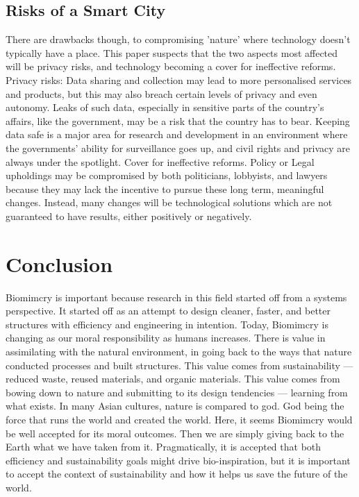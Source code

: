 \subsection{Risks of a Smart City}

There are drawbacks though, to compromising 'nature' where technology doesn't typically have a place. This paper suspects that the two aspects most affected will be privacy risks, and technology becoming a cover for ineffective reforms. 
Privacy risks: Data sharing and collection may lead to more personalised services and products, but this may also breach certain levels of privacy and even autonomy. Leaks of such data, especially in sensitive parts of the country's affairs, like the government, may be a risk that the country has to bear. Keeping data safe is a major area for research and development in an environment where the governments' ability for surveillance goes up, and civil rights and privacy are always under the spotlight.
Cover for ineffective reforms. Policy or Legal upholdings may be compromised by both politicians, lobbyists, and lawyers because they may lack the incentive to pursue these long term, meaningful changes. Instead, many changes will be technological solutions which are not guaranteed to have results, either positively or negatively.


\section{Conclusion}

Biomimcry is important because research in this field started off from a systems perspective. It started off as an attempt to design cleaner, faster, and better structures with efficiency and engineering in intention. Today, Biomimcry is changing as our moral responsibility as humans increases. There is value in assimilating with the natural environment, in going back to the ways that nature conducted processes and built structures. This value comes from sustainability --- reduced waste, reused materials, and organic materials. This value comes from bowing down to nature and submitting to its design tendencies --- learning from what exists. In many Asian cultures, nature is compared to god. God being the force that runs the world and created the world. Here, it seems Biomimcry would be well accepted for its moral outcomes. Then we are simply giving back to the Earth what we have taken from it. Pragmatically, it is accepted that both efficiency and sustainability goals might drive bio-inspiration, but it is important to accept the context of sustainability and how it helps us save the future of the world. 

